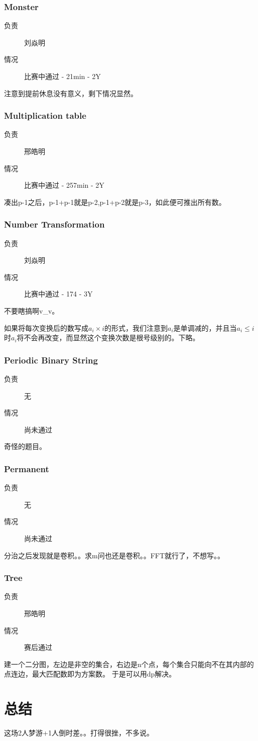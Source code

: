\documentclass[a4paper, 11pt, nofonts, nocap, fancyhdr]{ctexart}
\newcommand{\problem}[1]{\subsubsection{#1}}
\begin{document}
\problem{Monster}

\begin{description}
\item[负责] 刘焱明
\item[情况] 比赛中通过 - 21min - 2Y
\end{description}

注意到提前休息没有意义，剩下情况显然。

\problem{Multiplication table}

\begin{description}
\item[负责] 邢皓明
\item[情况] 比赛中通过 - 257min - 2Y
\end{description}

凑出p-1之后，p-1+p-1就是p-2,p-1+p-2就是p-3，如此便可推出所有数。

\problem{Number Transformation}

\begin{description}
\item[负责] 刘焱明
\item[情况] 比赛中通过 - 174 - 3Y
\end{description}

不要瞎搞啊v\_v。

如果将每次变换后的数写成$a_i \times i$的形式，我们注意到$a_i$是单调减的，并且当$a_i \leq i$时$a_i$将不会再改变，而显然这个变换次数是根号级别的。下略。

\problem{Periodic Binary String}

\begin{description}
\item[负责] 无
\item[情况] 尚未通过
\end{description}

奇怪的题目。

\problem{Permanent}

\begin{description}
\item[负责] 无
\item[情况] 尚未通过
\end{description}

分治之后发现就是卷积。。求m问也还是卷积。。FFT就行了，不想写。。

\problem{Tree}

\begin{description}
\item[负责] 邢皓明
\item[情况] 赛后通过
\end{description}

建一个二分图，左边是非空的集合，右边是n个点，每个集合只能向不在其内部的点连边，最大匹配数即为方案数。
于是可以用dp解决。

\section{总结}

这场2人梦游+1人倒时差。。打得很挫，不多说。
\end{document}
